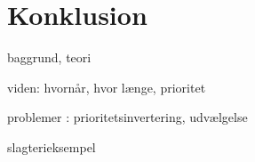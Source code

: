 \section{Konklusion}

baggrund, teori

viden: hvornår, hvor længe, prioritet


problemer : prioritetsinvertering, udvælgelse

slagterieksempel






